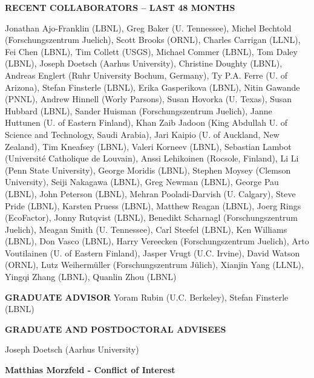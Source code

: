 \documentclass[11pt]{article}
\begin{document}
\vspace{.2 true in}
{\bf RECENT COLLABORATORS -- LAST 48 MONTHS}

\vspace{.075 true in}
Jonathan Ajo-Franklin (LBNL), 
Greg Baker (U. Tennessee),
Michel Bechtold (Forschungszentrum Juelich),
Scott Brooks (ORNL),
Charles Carrigan (LLNL),
Fei Chen (LBNL),
Tim Collett (USGS),
Michael Commer (LBNL),
Tom Daley (LBNL),
Joseph Doetsch (Aarhus University),
Christine Doughty (LBNL),
Andreas Englert (Ruhr University Bochum, Germany),
Ty P.A. Ferre (U. of Arizona),
Stefan Finsterle (LBNL),
Erika Gasperikova (LBNL),
Nitin Gawande (PNNL),
Andrew Hinnell (Worly Parsons),
Susan Hovorka (U. Texas),
Susan Hubbard (LBNL),
Sander Huisman (Forschungszentrum Juelich),
Janne Huttunen (U. of Eastern Finland),
Khan Zaib Jadoon (King Abdullah U. of Science and Technology, Saudi Arabia),
Jari Kaipio (U. of Auckland, New Zealand),
Tim Kneafsey (LBNL),
Valeri Korneev (LBNL),
Sebastian Lambot (Universit\'{e} Catholique de Louvain),
Anssi Lehikoinen (Rocsole, Finland),
Li Li (Penn State University),
George Moridis (LBNL),
Stephen Moysey (Clemson University),
Seiji Nakagawa (LBNL),
Greg Newman (LBNL),
George Pau (LBNL),
John Peterson (LBNL),
Mehran Pooladi-Darvish (U. Calgary),
Steve Pride (LBNL),
Karsten Pruess (LBNL),
Matthew Reagan (LBNL),
Joerg Rings (EcoFactor),
Jonny Rutqvist (LBNL),
Benedikt Scharnagl (Forschungszentrum Juelich),
Meagan Smith (U. Tennessee),
Carl Steefel (LBNL),
Ken Williams (LBNL),
Don Vasco (LBNL),
Harry Vereecken (Forschungszentrum Juelich),
Arto Voutilainen (U. of Eastern Finland),
Jasper Vrugt (U.C. Irvine),
David Watson (ORNL),
Lutz Weiherm\"{u}ller (Forschungszentrum J\"{u}lich),
Xianjin Yang (LLNL),
Yingqi Zhang (LBNL),
Quanlin Zhou (LBNL)
\vspace{.2 true in}

{\bf GRADUATE ADVISOR}
\vspace{.075 true in}
Yoram Rubin (U.C. Berkeley),
Stefan Finsterle (LBNL)

\vspace{.2 true in}
{\bf GRADUATE AND POSTDOCTORAL ADVISEES}

\vspace{.075 true in}
Joseph Doetsch (Aarhus University) 

\vspace{.2 true in}


\newpage
\begin{center}
{\Large{\textbf{Matthias Morzfeld - Conflict of Interest}}}
\end{center}
\end{document}
